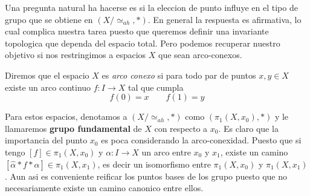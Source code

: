 Una pregunta natural ha
hacerse es si la eleccion de punto influye en el tipo de grupo que se
obtiene en \((X / \simeq_{ah}, *)\). En general la respuesta es
afirmativa, lo cual complica nuestra tarea puesto que queremos definir
una invariante topologica que dependa del espacio total. Pero podemos
recuperar nuestro objetivo si nos restringimos a espacios \(X\) que sean
arco-conexos.
\begin{definicion}
  Diremos que el espacio \(X\) es \emph{arco conexo} si para todo par de
  puntos \(x,y \in X\) existe un arco continuo \(f : I \to X\) tal que
  cumpla
  \[ f(0) = x \qquad f(1) = y \]
\end{definicion}
Para estos espacios, denotamos a \((X / \simeq_{ah}, *)\) como
\((\pi_1(X,x_0), *)\) y le llamaremos \textbf{grupo fundamental} de \(X\) con
respecto a \(x_0\). Es claro que la importancia del punto \(x_0\) es poca
considerando la arco-conexidad. Puesto que si tengo \([f] \in
\pi_1(X,x_0)\) y \(\alpha : I \to X\) un arco entre \(x_0\) y \(x_1\),
existe un camino \([\hat{\alpha} * f * \alpha] \in \pi_1(X,x_1)\), es
decir un isomorfismo entre \(\pi_1 (X, x_0)\) y \(\pi_1 (X, x_1)\). Aun
asi es conveniente reificar los puntos bases de los grupo puesto que no
necesariamente existe un camino canonico entre ellos.

